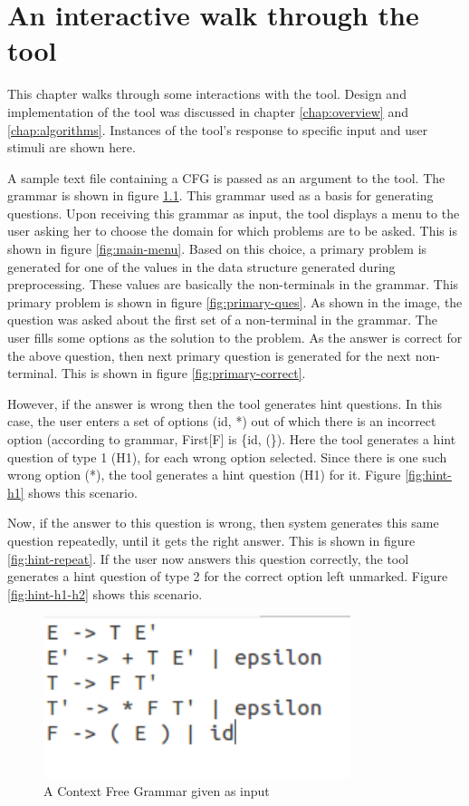\chapter{An interactive walk through the tool}
\label{chap:interactions}

This chapter walks through some interactions with the tool. Design and implementation of the tool was discussed in chapter \ref{chap:overview} and \ref{chap:algorithms}. Instances of the tool's response to specific input and user stimuli are shown here.

A sample text file containing a CFG is passed as an argument to the tool. The grammar is shown in figure \ref{fig:grammar}. This grammar used as a basis for generating questions. Upon receiving this grammar as input, the tool displays a menu to the user asking her to choose the domain for which problems are to be asked. This is shown in figure \ref{fig:main-menu}. Based on this choice, a primary problem is generated for one of the values in the data structure generated during preprocessing. These values are basically the non-terminals in the grammar. This primary problem is shown in figure \ref{fig:primary-ques}. As shown in the image, the question was asked about the first set of a non-terminal in the grammar. The user fills some options as the solution to the problem. As the answer is correct for the above question, then next primary question is generated for the next non-terminal. This is shown in figure \ref{fig:primary-correct}.

However, if the answer is wrong then the tool generates hint questions. In this case, the user enters a set of options (id, *) out of which there is an incorrect option (according to grammar, First[F] is \{id, (\}). Here the tool generates a hint question of type 1 (H1), for each wrong option selected. Since there is one such wrong option (*), the tool generates a hint question (H1) for it. Figure \ref{fig:hint-h1} shows this scenario. 

Now, if the answer to this question is wrong, then system generates this same question repeatedly, until it gets the right answer. This is shown in figure \ref{fig:hint-repeat}. If the user now answers this question correctly, the tool generates a hint question of type 2 for the correct option left unmarked. Figure \ref{fig:hint-h1-h2} shows this scenario.

\begin{figure}
\centering
\includegraphics[width=0.8\textwidth]{grammar.png}
\caption{A Context Free Grammar given as input}
\label{fig:grammar}
\end{figure}

